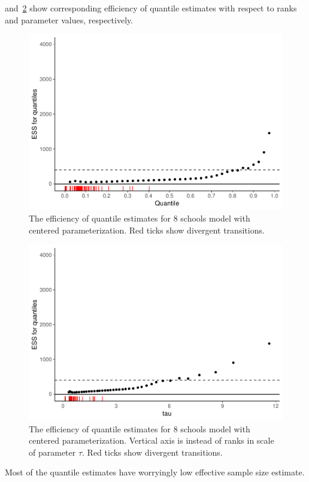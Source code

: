 \documentclass[american,]{article}
\begin{document}
and~\ref{fig:quantile-ess-fit-cp-norank-1} show corresponding
efficiency of quantile estimates with respect to ranks and parameter
values, respectively.
\begin{figure}[tp]
  \centering
  \includegraphics[width=0.6\linewidth]{graphics/quantile-ess-fit-cp-1.pdf}
  \caption{The efficiency of quantile estimates for 8 schools model with centered parameterization. Red ticks show divergent transitions.}
  \label{fig:quantile-ess-fit-cp-1}
\end{figure}
\begin{figure}[tp]
  \centering
  \includegraphics[width=0.6\linewidth]{graphics/quantile-ess-fit-cp-norank-1.pdf}
  \caption{The efficiency of quantile estimates for 8 schools model with centered parameterization. Vertical axis is instead of ranks in scale of parameter $\tau$. Red ticks show divergent transitions.}
  \label{fig:quantile-ess-fit-cp-norank-1}
\end{figure}
Most of the quantile estimates have worryingly low effective sample
size estimate.
\end{document}
